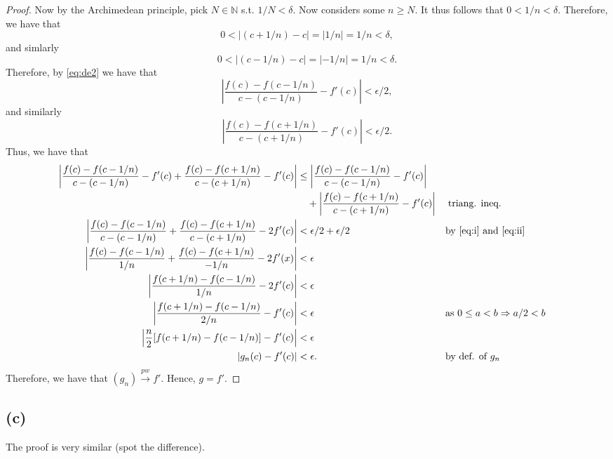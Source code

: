 \documentclass[10pt]{article}
\begin{document}
\begin{proof}
    Now by the Archimedean principle, pick $N\in\mathbb{N}$ s.t. $1/N < \delta.$ Now considers some $n\ge N.$ It thus follows that $0<1/n < \delta.$ Therefore, we have that
    \[0<|(c+1/n) -c| = |1/n| = 1/n<\delta,\]
    and simlarly
    \[0<|(c-1/n) -c| =  \left |-1/n\right | = 1/n <\delta.\]
    Therefore, by \eqref{eq:de2} we have that
    \begin{equation} \label{eq:i}
        \left|\frac{f(c)-f(c-1/n)}{c-(c-1/n)} - f'(c)\right|< \epsilon / 2,
    \end{equation}
    and similarly
    \begin{equation} \label{eq:ii}
        \left|\frac{f(c)-f(c+1/n)}{c-(c+1/n)} - f'(c)\right|< \epsilon / 2.
    \end{equation}
    Thus, we have that
    \begin{alignat*}{2}
        \left|\frac{f(c)-f(c-1/n)}{c-(c-1/n)} -f'(c) + \frac{f(c)-f(c+1/n)}{c-(c+1/n)} - f'(c)\right| &\le \left|\frac{f(c)-f(c-1/n)}{c-(c-1/n)} - f'(c)\right|\\
        &\quad+  \left|\frac{f(c)-f(c+1/n)}{c-(c+1/n)} - f'(c)\right| &&\;\text{triang. ineq.}\\
        \left|\frac{f(c)-f(c-1/n)}{c-(c-1/n)} + \frac{f(c)-f(c+1/n)}{c-(c+1/n)} -2f'(c)\right|&< \epsilon/2 + \epsilon/2 && \text{by \eqref{eq:i} and \eqref{eq:ii}}\\
        \left |\frac{f(c)-f(c-1/n)}{1/n} + \frac{f(c)-f(c+1/n)}{-1/n} -2f'(x)\right | &< \epsilon\\
        \left| \frac{f(c+1/n)-f(c-1/n)}{1/n} -2f'(c)\right | &<\epsilon\\
        \left| \frac{f(c+1/n)-f(c-1/n)}{2/n} -f'(c)\right | &<\epsilon \qquad&&\text{as $0\le a<b\Rightarrow a/2<b$}\\
        \left| \frac{n}{2}[f(c+1/n)-f(c-1/n)]-f'(c)\right | &<\epsilon\\
        |g_n(c)-f'(c)| &<\epsilon. &&\text{by def. of $g_n$} 
    \end{alignat*}
    Therefore, we have that $(g_n)\stackrel{pw}{\to}f'.$ Hence, $g=f'.$
\end{proof}

\subsection*{(c)}

The proof is very similar (spot the difference).
\end{document}
